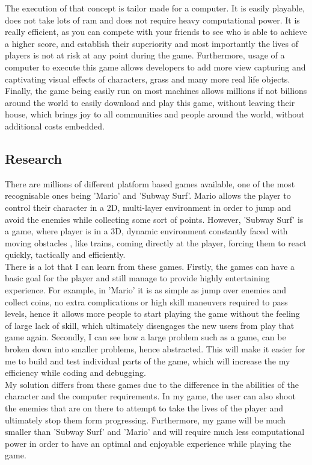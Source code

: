 \documentclass[12pt]{article}
\begin{document}
The execution of that concept is tailor made for a computer. It is easily playable, does not take lots of ram and does not require heavy computational power. It is really efficient, as you can compete with your friends to see who is able to achieve a higher score, and establish their superiority and most importantly the lives of players is not at risk at any point during the game. Furthermore, usage of a computer to execute this game allows developers to add more view capturing and captivating visual effects of characters, grass and many more real life objects. Finally, the game being easily run on most machines allows millions if not billions around the world to easily download and play this game, without leaving their house, which brings joy to all communities and people around the world, without additional costs embedded.

\subsection{Research}
There are millions of different platform based games available, one of the most recognisable ones being 'Mario' and 'Subway Surf'. Mario allows the player to control their character in a 2D, multi-layer environment in order to jump and avoid the enemies while collecting some sort of points. However, 'Subway Surf' is a game, where player is in a 3D, dynamic environment constantly faced with moving obstacles , like trains, coming directly at the player, forcing them to react quickly, tactically and efficiently. 
\\

There is a lot that I can learn from these games. Firstly, the games can have a basic goal for the player and still manage to provide highly entertaining experience. For example, in 'Mario' it is as simple as jump over enemies and collect coins, no extra complications or high skill maneuvers required to pass levels, hence it allows more people to start playing the game without the feeling of large lack of skill, which ultimately disengages the new users from play that game again. Secondly, I can see how a large problem such as a game, can be broken down into smaller problems, hence abstracted. This will make it easier for me to build and test individual parts of the game, which will increase the my efficiency while coding and debugging.
\\

My solution differs from these games due to the difference in the abilities of the character and the computer requirements. In my game, the user can also shoot the enemies that are on there to attempt to take the lives of the player and ultimately stop them form progressing. Furthermore, my game will be much smaller than 'Subway Surf' and 'Mario' and will require much less computational power in order to have an optimal and enjoyable experience while playing the game.
\end{document}
